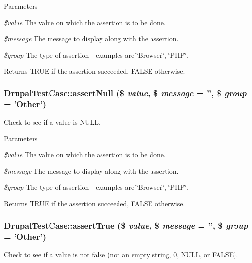 \begin{DoxyParams}{Parameters}
\item[{\em \$value}]The value on which the assertion is to be done. \item[{\em \$message}]The message to display along with the assertion. \item[{\em \$group}]The type of assertion -\/ examples are \char`\"{}Browser\char`\"{}, \char`\"{}PHP\char`\"{}. \end{DoxyParams}
\begin{DoxyReturn}{Returns}
TRUE if the assertion succeeded, FALSE otherwise. 
\end{DoxyReturn}
\hypertarget{classDrupalTestCase_ab04d0a088003f5e7aac49a4888710cc8}{
\subsubsection[{assertNull}]{\setlength{\rightskip}{0pt plus 5cm}DrupalTestCase::assertNull (\$ {\em value}, \/  \$ {\em message} = {\ttfamily ''}, \/  \$ {\em group} = {\ttfamily 'Other'})}}
\label{classDrupalTestCase_ab04d0a088003f5e7aac49a4888710cc8}
Check to see if a value is NULL.


\begin{DoxyParams}{Parameters}
\item[{\em \$value}]The value on which the assertion is to be done. \item[{\em \$message}]The message to display along with the assertion. \item[{\em \$group}]The type of assertion -\/ examples are \char`\"{}Browser\char`\"{}, \char`\"{}PHP\char`\"{}. \end{DoxyParams}
\begin{DoxyReturn}{Returns}
TRUE if the assertion succeeded, FALSE otherwise. 
\end{DoxyReturn}
\hypertarget{classDrupalTestCase_a05171bcd0d7a73b1164502e6477423ff}{
\subsubsection[{assertTrue}]{\setlength{\rightskip}{0pt plus 5cm}DrupalTestCase::assertTrue (\$ {\em value}, \/  \$ {\em message} = {\ttfamily ''}, \/  \$ {\em group} = {\ttfamily 'Other'})}}
\label{classDrupalTestCase_a05171bcd0d7a73b1164502e6477423ff}
Check to see if a value is not false (not an empty string, 0, NULL, or FALSE).


